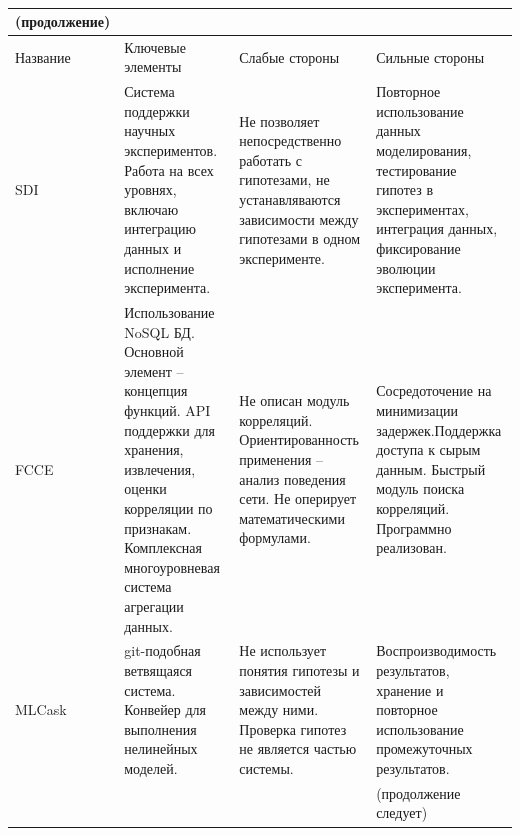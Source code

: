 \begin{table} [ht]%
	\caption*{}%
    \setlength\extrarowheight{0pt} %
    \setlength{\tymin}{2.3cm}%
	\begin{tabulary}{\textwidth}{@{}>{\zz}L >{\zz}L >{\zz}L >{\zz}L@{}}%
        \toprule     %
        \scriptsize (продолжение) & & &
        \\
        \midrule
    	Название &
    	Ключевые элементы &
    	Слабые стороны &
    	Сильные стороны	\\
        \midrule %
        
        SDI &
        Система поддержки научных экспериментов. Работа на всех уровнях, включаю интеграцию данных и исполнение 
        эксперимента. &
        Не позволяет непосредственно работать с гипотезами, не устанавляваются зависимости между гипотезами в 
        одном эксперименте.   &
        Повторное использование данных моделирования, тестирование гипотез в экспериментах, интеграция данных, 
        фиксирование эволюции эксперимента.
        \\
        \midrule
        FCCE &
        Использование NoSQL БД. Основной элемент – концепция функций. API поддержки для хранения, извлечения, 
        оценки корреляции по признакам.
        Комплексная многоуровневая система агрегации данных. 
        &
        Не описан модуль корреляций. Ориентированность применения – анализ поведения сети. 
        Не оперирует математическими формулами. 
        &
        Сосредоточение на минимизации задержек.Поддержка доступа к сырым данным. Быстрый модуль поиска корреляций. 
        Программно реализован.
        \\
        \midrule
        MLCask &
        git-подобная ветвящаяся система. Конвейер для выполнения нелинейных моделей. &
        Не использует понятия гипотезы и зависимостей между ними. Проверка гипотез не является частью системы. &
        Воспроизводимость результатов, хранение и повторное использование промежуточных результатов.
        \\
        \midrule
        & &  & \scriptsize (продолжение следует)
        \\
        \bottomrule %
	\end{tabulary}%
\end{table}

